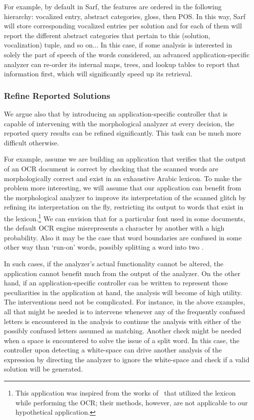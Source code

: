 \documentclass[a4,12pt]{report}
\begin{document}
For example, by default in Sarf, the features are ordered in the following hierarchy: 
vocalized entry, abstract categories, gloss, then POS. In this way, Sarf will store corresponding vocalized entries per 
solution and for each of them will report the different abstract categories that pertain to this (solution, vocalization) tuple,
and so on...
In this case, if some analysis is interested in solely the part of speech of the words considered, an advanced 
application-specific analyzer can re-order its internal maps, trees, and lookup tables to report 
that information first, which will significantly speed up its retrieval.

\subsubsection{Refine Reported Solutions}

We argue also that by introducing an application-specific controller that is capable
of intervening with the morphological analyzer at every decision, the reported query results 
can be refined significantly. This task can be much more difficult otherwise. 

For example, assume we are
building an application that verifies that the output of an OCR document is correct by checking
that the scanned words are morphologically correct and exist in an exhaustive Arabic lexicon.
To make the problem more interesting, we will assume that our application can benefit from the morphological analyzer to 
improve its interpretation of the scanned glitch by refining its interpretation on the fly, restricting its output
to words that exist in the lexicon.\footnote{This application was inspired from the works of~\cite{Badr:95,Obaid:98} that 
utilized the lexicon while performing the OCR; their methods, however, are not applicable to our
hypothetical application.}
We can envision that for a particular font used in some documents, 
the default OCR engine misrepresents a character 
by another with a high probability. Also it may be the case that word 
boundaries are confused in some other way than `run-on' words, possibly splitting a word into two \cite{Kukich:92}.

In such cases, if the analyzer's actual functionality cannot be altered, the application cannot 
benefit much from the output of the analyzer. On the other hand, if an application-specific controller
can be written to represent those peculiarities in the application at hand, the analysis will become 
of high utility. The interventions need not be complicated. For instance, in the above examples, all that might 
be needed is to intervene whenever any of the frequently confused letters is encountered in the analysis 
to continue the analysis with either of the possibly confused letters assumed as matching.
Another check might be needed when a space is encountered to solve the issue of a split word.
In this case, the controller upon detecting a white-space can drive another analysis of the expression by directing 
the analyzer to ignore the white-space and check if a valid solution will be generated.
\end{document}
